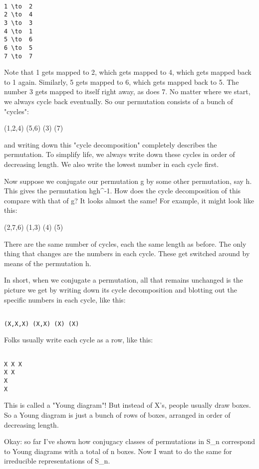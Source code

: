 \begin{verbatim}

1 \to  2
2 \to  4 
3 \to  3
4 \to  1
5 \to  6
6 \to  5
7 \to  7
\end{verbatim}
    
Note that 1 gets mapped to 2, which gets mapped to 4, which gets mapped
back to 1 again.   Similarly, 5 gets mapped to 6, which gets mapped back
to 5.  The number 3 gets mapped to itself right away, as does 7.  No matter 
where we start, we always cycle back eventually.  So our permutation
consists of a bunch of "cycles":

(1,2,4) (5,6) (3) (7)

and writing down this "cycle decomposition" completely describes the
permutation.   To simplify life, we always write down these cycles in
order of decreasing length.  We also write the lowest number in each
cycle first.  

Now suppose we conjugate our permutation g by some other permutation,
say h.  This gives the permutation hgh^{-1}.  How does the cycle
decomposition of this compare with that of g?  It looks almost the same!
For example, it might look like this:

(2,7,6) (1,3) (4) (5)

There are the same number of cycles, each the same length as before. 
The only thing that changes are the numbers in each cycle.  These get
switched around by means of the permutation h.  

In short, when we conjugate a permutation, all that remains unchanged is
the picture we get by writing down its cycle decomposition and blotting
out the specific numbers in each cycle, like this:


\begin{verbatim}

(X,X,X) (X,X) (X) (X)
\end{verbatim}
    
Folks usually write each cycle as a row, like this:


\begin{verbatim}

X X X
X X
X
X
\end{verbatim}
    
This is called a "Young diagram"!  But instead of X's, people
usually draw boxes.  So a Young diagram is just a bunch of rows of
boxes, arranged in order of decreasing length.

Okay: so far I've shown how conjugacy classes of permutations in S_{n}
correspond to Young diagrams with a total of n boxes.  Now I want to do
the same for irreducible representations of S_{n}.  

